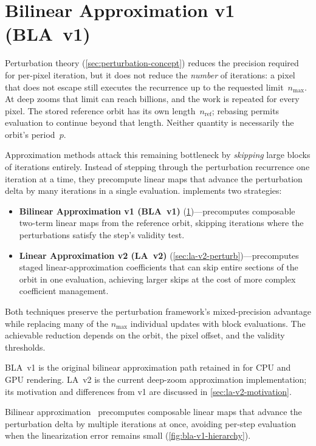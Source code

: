 
\section{Bilinear Approximation v1 (BLA~v1)}
\label{sec:bilinear-approx}
\label{sec:approx-accel}

Perturbation theory (\cref{sec:perturbation-concept}) reduces the
precision required for per-pixel iteration, but it does not reduce the
\emph{number} of iterations: a pixel that does not escape still executes
the recurrence up to the requested limit~$n_{\max}$. At deep zooms that
limit can reach billions, and the work is repeated for every pixel.
The stored reference orbit has its own length~$n_{\mathrm{ref}}$;
rebasing permits evaluation to continue beyond that length. Neither
quantity is necessarily the orbit's period~$p$.

Approximation methods attack this remaining bottleneck by \emph{skipping}
large blocks of iterations entirely.  Instead of stepping through the
perturbation recurrence one iteration at a time, they precompute linear
maps that advance the perturbation delta by many iterations in a single
evaluation. \FractalShark{} implements two strategies:
\begin{itemize}
\item \textbf{Bilinear Approximation v1 (BLA~v1)}
  (\cref{sec:bilinear-approx})---precomputes composable two-term linear
  maps from the reference orbit, skipping iterations where the
  perturbations satisfy the step's validity test.
\item \textbf{Linear Approximation v2 (LA~v2)}
  (\cref{sec:la-v2-perturb})---precomputes staged linear-approximation
  coefficients that can skip entire sections of the orbit in one
  evaluation, achieving larger skips at the cost of more complex
  coefficient management.
\end{itemize}
Both techniques preserve the perturbation framework's mixed-precision
advantage while replacing many of the $n_{\max}$ individual updates
with block evaluations. The achievable reduction depends on the orbit,
the pixel offset, and the validity thresholds.

BLA~v1 is the original bilinear approximation path retained in
\FractalShark{} for CPU and GPU rendering. LA~v2 is the current
deep-zoom approximation implementation; its motivation and differences
from v1 are discussed in \cref{sec:la-v2-motivation}.

Bilinear approximation~\cite{Imagina,Thompson2023BLA} precomputes composable linear
maps that advance the perturbation delta by multiple iterations at once,
avoiding per-step evaluation when the linearization error remains small
(\cref{fig:bla-v1-hierarchy}).

